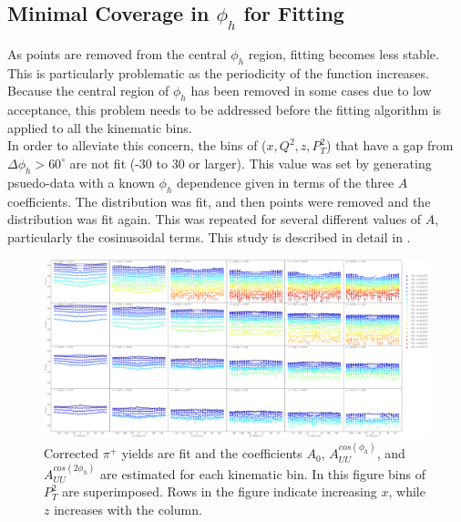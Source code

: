 \subsection{Minimal Coverage in $\phi_h$ for Fitting}
As points are removed from the central $\phi_h$ region, fitting becomes less stable.  This is particularly problematic as the periodicity of the function increases.  Because the central region of $\phi_h$ has been removed in some cases due to low acceptance, this problem needs to be addressed before the fitting algorithm is applied to all the kinematic bins.  \\

In order to alleviate this concern, the bins of ($x, Q^2, z, P_T^2$) that have a gap from $\Delta \phi_h > 60^{\circ}$ are not fit (-30 to 30 or larger).  This value was set by generating psuedo-data with a known $\phi_h$ dependence given in terms of the three $A$ coefficients.  The distribution was fit, and then points were removed and the distribution was fit again.  This was repeated for several different values of $A$, particularly the cosinusoidal terms.  This study is described in detail in \cite{theses-harrison:2015}.

\begin{figure}
	\centering
	\includegraphics[width=\textwidth]{image/plots/sidis/pip_counts_with_fit_x_z.pdf}	
	\caption[Corrected yield fits for $\pi^+$]{Corrected $\pi^+$ yields are fit and the coefficients $A_{0}$, $A_{UU}^{cos(\phi_h)}$, and $A_{UU}^{cos(2\phi_h)}$ are estimated for each kinematic bin.  In this figure bins of $P_T^2$ are superimposed.  Rows in the figure indicate increasing $x$, while $z$ increases with the column.}
		\label{fig:pip-datafit}

\end{figure}
%	
%	

